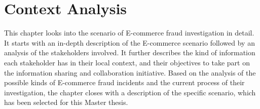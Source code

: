 
\chapter{Context Analysis} %
\label{cha:context_analysis}

This chapter looks into the scenario of \gls{E-commerce} fraud investigation in detail. It starts with an in-depth description of the \gls{E-commerce} scenario followed by an analysis of the stakeholders involved. It further describes the kind of information each stakeholder has in their local context, and their objectives to take part on the information sharing and collaboration initiative. Based on the analysis of the possible kinds of \gls{E-commerce} fraud incidents and the current process of their investigation, the chapter closes with a description of the specific scenario, which has been selected for this Master thesis.











